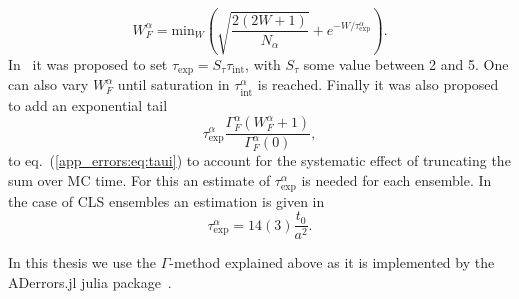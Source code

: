 \begin{equation}
W_F^{\alpha}=\textrm{min}_W\left(\sqrt{\frac{2(2W+1)}{N_{\alpha}}}+e^{-W/\tau_{\textrm{exp}}^{\alpha}}\right).
\end{equation}
In~\citep{Wolff:2003sm} it was proposed to set $\tau_{\textrm{exp}}=S_{\tau}\tau_{\textrm{int}}$, with $S_{\tau}$ some value between 2 and 5. One can also vary $W_F^{\alpha}$ until saturation in $\tau_{\textrm{int}}^{\alpha}$ is reached. Finally it was also proposed to add an exponential tail~\citep{Wolff:2003sm}
\begin{equation}
\tau_{\textrm{exp}}^{\alpha}\frac{\Gamma_F^{\alpha}(W_F^{\alpha}+1)}{\Gamma_F^{\alpha}(0)},
\end{equation}
to eq.~(\ref{app_errors:eq:taui}) to account for the systematic effect of truncating the sum over MC time. For this an estimate of $\tau_{\textrm{exp}}^{\alpha}$ is needed for each ensemble. In the case of CLS ensembles an estimation is given in~\citep{Bruno:2014jqa}
\begin{equation}
\tau_{\textrm{exp}}^{\alpha}=14(3)\frac{t_0}{a^2}.
\end{equation}

In this thesis we use the $\Gamma$-method explained above as it is implemented by the ADerrors.jl julia package~\citep{Ramos:2020scv}.



